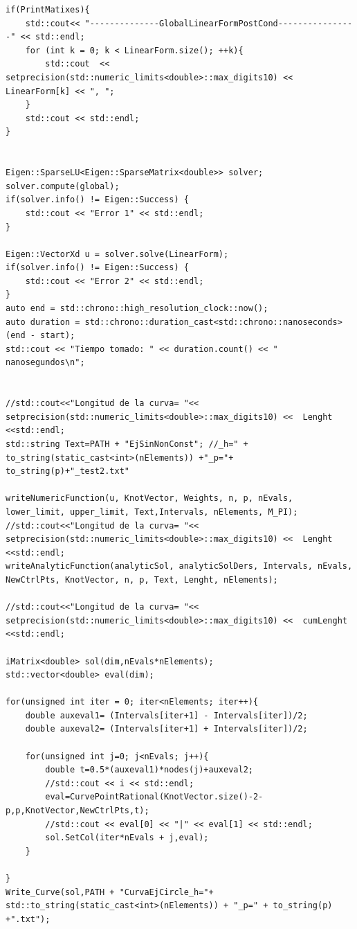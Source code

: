 \documentclass[11pt]{book}
\theoremstyle{plain} %
\theoremstyle{definition} %
\theoremstyle{definition} %
\begin{document}
\begin{verbatim}
if(PrintMatixes){
    std::cout<< "--------------GlobalLinearFormPostCond----------------" << std::endl;
    for (int k = 0; k < LinearForm.size(); ++k){
        std::cout  << setprecision(std::numeric_limits<double>::max_digits10) << LinearForm[k] << ", ";
    }
    std::cout << std::endl;
}
        

Eigen::SparseLU<Eigen::SparseMatrix<double>> solver;
solver.compute(global);
if(solver.info() != Eigen::Success) {
    std::cout << "Error 1" << std::endl;
}

Eigen::VectorXd u = solver.solve(LinearForm);
if(solver.info() != Eigen::Success) {
    std::cout << "Error 2" << std::endl;
}
auto end = std::chrono::high_resolution_clock::now();
auto duration = std::chrono::duration_cast<std::chrono::nanoseconds>(end - start);
std::cout << "Tiempo tomado: " << duration.count() << " nanosegundos\n";

       
//std::cout<<"Longitud de la curva= "<< setprecision(std::numeric_limits<double>::max_digits10) <<  Lenght <<std::endl;
std::string Text=PATH + "EjSinNonConst"; //_h=" + to_string(static_cast<int>(nElements)) +"_p="+ to_string(p)+"_test2.txt"
        
writeNumericFunction(u, KnotVector, Weights, n, p, nEvals, lower_limit, upper_limit, Text,Intervals, nElements, M_PI);
//std::cout<<"Longitud de la curva= "<< setprecision(std::numeric_limits<double>::max_digits10) <<  Lenght <<std::endl;
writeAnalyticFunction(analyticSol, analyticSolDers, Intervals, nEvals, NewCtrlPts, KnotVector, n, p, Text, Lenght, nElements);
               
//std::cout<<"Longitud de la curva= "<< setprecision(std::numeric_limits<double>::max_digits10) <<  cumLenght <<std::endl;
        
iMatrix<double> sol(dim,nEvals*nElements);
std::vector<double> eval(dim);

for(unsigned int iter = 0; iter<nElements; iter++){
    double auxeval1= (Intervals[iter+1] - Intervals[iter])/2;
    double auxeval2= (Intervals[iter+1] + Intervals[iter])/2;

    for(unsigned int j=0; j<nEvals; j++){
        double t=0.5*(auxeval1)*nodes(j)+auxeval2;
        //std::cout << i << std::endl;
        eval=CurvePointRational(KnotVector.size()-2-p,p,KnotVector,NewCtrlPts,t);
        //std::cout << eval[0] << "|" << eval[1] << std::endl;
        sol.SetCol(iter*nEvals + j,eval);
    }
            
}
Write_Curve(sol,PATH + "CurvaEjCircle_h="+  std::to_string(static_cast<int>(nElements)) + "_p=" + to_string(p) +".txt");
        
\end{verbatim}
\end{document}
